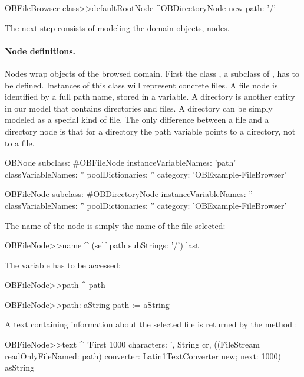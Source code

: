 \documentclass[a4paper,10pt,twoside]{book}
\begin{document}
\begin{code}{}    
OBFileBrowser class>>defaultRootNode
     ^OBDirectoryNode new path: '/'
\end{code}

The next step consists of modeling the domain objects, \ie nodes.

\paragraph{Node definitions.} Nodes wrap objects of the browsed domain. First the class , a subclass of , has to be defined. Instances of this class will represent concrete files. A file node is identified by a full path name, stored in a variable. A directory is another entity in our model that contains directories and files. A directory can be simply modeled as a special kind of file. The only difference between a file and a directory node is that for a directory the path variable points to a directory, not to a file. 

\begin{code}{}
OBNode subclass: #OBFileNode
     instanceVariableNames: 'path'
     classVariableNames: ''
     poolDictionaries: ''
     category: 'OBExample-FileBrowser'

OBFileNode subclass: #OBDirectoryNode
     instanceVariableNames: ''
     classVariableNames: ''
     poolDictionaries: ''
     category: 'OBExample-FileBrowser'
\end{code}

The name of the node is simply the name of the file selected:

\begin{code}{}
OBFileNode>>name
     ^ (self path subStrings: '/') last
\end{code}

The variable  has to be accessed:

\begin{code}{}
OBFileNode>>path
     ^ path

OBFileNode>>path: aString
     path := aString
\end{code}

A text containing information about the selected file is returned by the method :

\begin{code}{}
OBFileNode>>text
     ^ 'First 1000 characters: ', String cr,
        ((FileStream readOnlyFileNamed: path) converter: Latin1TextConverter new; 
              next: 1000) asString
\end{code}
\end{document}
